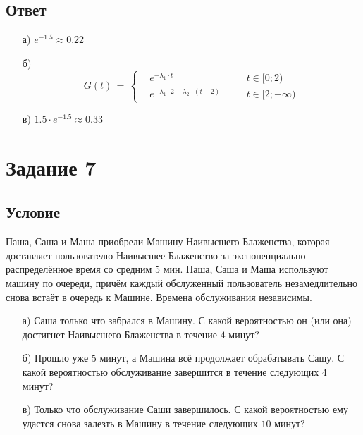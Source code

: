 \documentclass{article}
\begin{document}
\subsection*{Ответ}
\begin{enumerate}
\item[а)] $ e^{-1.5} \! \approx \! 0.22 $
\item[б)]
\begin{equation*}
G(t) \, = \,
\left\{
\begin{aligned}
& e^{-\lambda_1 \cdot t} & & \quad t \! \in \! [0;2) \\
& e^{-\lambda_1 \cdot 2 - \lambda_2 \cdot (t-2)} & & \quad t \! \in \! [2;+\infty )
\end{aligned}
\right.
\end{equation*}
\item[в)] $ 1.5 \! \cdot \! e^{-1.5} \! \approx \! 0.33 $
\end{enumerate}
\section*{Задание 7}
\subsection*{Условие}
Паша, Саша и Маша приобрели Машину Наивысшего Блаженства, которая доставляет пользователю Наивысшее Блаженство за экспоненциально распределённое время со средним $ 5 $ мин. Паша, Саша и Маша используют машину по очереди, причём каждый обслуженный пользователь незамедлительно снова встаёт в очередь к Машине. Времена обслуживания независимы.
\begin{enumerate}
\item[а)] Саша только что забрался в Машину. С какой вероятностью он (или она) достигнет Наивысшего Блаженства в течение $ 4 $ минут?
\item[б)]  Прошло уже $ 5 $ минут, а Машина всё продолжает обрабатывать Сашу. С какой вероятностью обслуживание завершится в течение следующих $ 4 $ минут?
\item[в)] Только что обслуживание Саши завершилось. С какой вероятностью ему удастся снова залезть в Машину в течение следующих $ 10 $ минут?
\end{enumerate}
\end{document}
